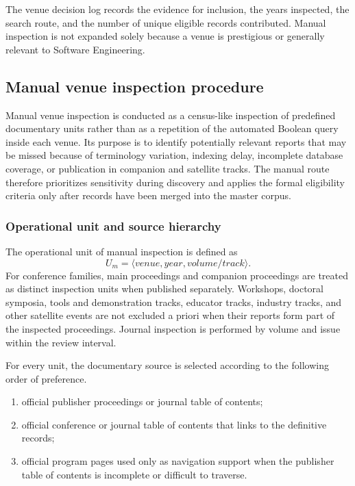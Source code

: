 The venue decision log records the evidence for inclusion, the years inspected, the search route, and the number of unique eligible records contributed. Manual inspection is not expanded solely because a venue is prestigious or generally relevant to Software Engineering.


\subsection{Manual venue inspection procedure}
\label{sec:protocol_manual_search_procedure}

Manual venue inspection is conducted as a census-like inspection of predefined documentary
units rather than as a repetition of the automated Boolean query inside each venue. Its purpose
is to identify potentially relevant reports that may be missed because of terminology variation,
indexing delay, incomplete database coverage, or publication in companion and satellite tracks.
The manual route therefore prioritizes sensitivity during discovery and applies the formal
eligibility criteria only after records have been merged into the master corpus.

\subsubsection{Operational unit and source hierarchy}

The operational unit of manual inspection is defined as
\[
U_m=\langle venue,year,volume/track\rangle .
\]
For conference families, main proceedings and companion proceedings are treated as distinct
inspection units when published separately. Workshops, doctoral symposia, tools and demonstration
tracks, educator tracks, industry tracks, and other satellite events are not excluded a priori
when their reports form part of the inspected proceedings. Journal inspection is performed by
volume and issue within the review interval.

For every unit, the documentary source is selected according to the following order of preference.

\begin{enumerate}[label=\arabic*)]
    \item official publisher proceedings or journal table of contents;
    \item official conference or journal table of contents that links to the definitive records;
    \item official program pages used only as navigation support when the publisher table of contents
    is incomplete or difficult to traverse.
\end{enumerate}

